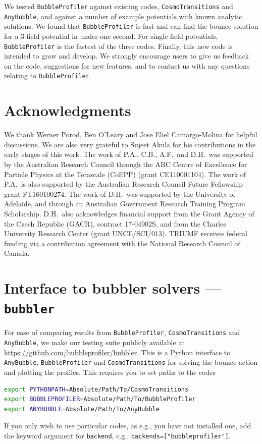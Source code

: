 \documentclass[final,3p,11pt,pdflatex]{elsarticle}
\makeatletter
\renewcommand{\appendix}{%
    \setcounter{section}{0}
    \renewcommand*{\thesection}{\Alph{section}}
}
\newcommand{\bubblergitrepo}{%
  \url{https://github.com/bubbleprofiler/bubbler}}
\newcommand{\ab}{\texttt{AnyBubble}\@\xspace}
\newcommand{\bp}{\texttt{BubbleProfiler}\@\xspace}
\newcommand{\code}[1]{\ifmmode\text{\nolinkurl{#1}}\else\nolinkurl{#1}\fi}
\newcommand{\cosmo}{\texttt{CosmoTransitions}\@\xspace}
\makeatother
\begin{document}
We tested \bp against existing codes, \cosmo and \ab, and against a
number of example potentials with known analytic solutions. We found
that \bp is fast and can find the bounce solution for a $3$ field
potential in under one second. For single field potentials, \bp is the fastest of the three codes. Finally, this new code is intended to grow and
develop. We strongly encourage users to give us feedback on the code, suggestions for new features, and to contact us with any questions relating to \bp.


\label{sec:conclusions}


\section*{Acknowledgments}

We thank Werner Porod, Ben O'Leary and Jose Eliel Camargo-Molina for
helpful discussions. We are also very grateful to Sujeet Akula for
his contributions in the early stages of this work.
%
The work of P.A., C.B., A.F.\ and D.H.\ was supported by the Australian
Research Council through the ARC Centre of Excellence for Particle Physics
at the Terascale (CoEPP) (grant CE110001104).  The work of P.A.\ is also
supported by the Australian Research Council Future Fellowship grant
FT160100274.  The work of D.H.\ was supported by the University of Adelaide,
and through an Australian Government Research Training Program Scholarship.
D.H.\ also acknowledges financial support from the Grant Agency of the Czech
Republic (GACR), contract 17-04902S, and from the
Charles University Research Center (grant UNCE/SCI/013).
TRIUMF receives federal funding via a contribution agreement with the National Research Council of Canada.

\appendix

\section{Interface to bubbler solvers --- \code{bubbler}}\label{sec:bubbler}

For ease of comparing results from \bp, \cosmo and \ab, we make our testing
suite publicly available at \bubblergitrepo.
This is a Python interface to \ab, \bp and \cosmo for solving the bounce action
and plotting the profiles.
This requires you to set paths to the codes
\begin{lstlisting}[language=bash]
export PYTHONPATH=Absolute/Path/To/CosmoTransitions
export BUBBLEPROFILER=Absolute/Path/To/BubbleProfiler
export ANYBUBBLE=Absolute/Path/To/AnyBubble
\end{lstlisting}
If you only wish to use particular codes, as e.g., you have not installed one, add the keyword argument for \code{backend}, e.g., \code{backends=["bubbleprofiler"]}.
\end{document}

